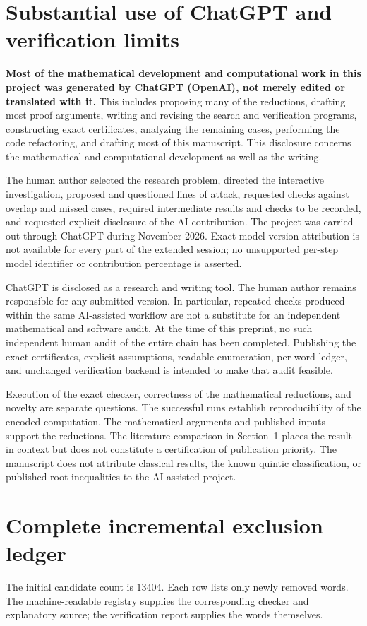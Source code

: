 \documentclass[11pt]{article}
\theoremstyle{definition}
\begin{document}
\section{Substantial use of ChatGPT and verification limits}\label{sec:ai}

\textbf{Most of the mathematical development and computational work in this
project was generated by ChatGPT (OpenAI), not merely edited or translated
with it.} This includes proposing many of the reductions, drafting most
proof arguments, writing and revising the search and verification
programs, constructing exact certificates, analyzing the remaining cases,
performing the code refactoring, and drafting most of this manuscript.
This disclosure concerns the mathematical and computational development
as well as the writing.

The human author selected the research problem, directed the interactive
investigation, proposed and questioned lines of attack, requested checks
against overlap and missed cases, required intermediate results and checks
to be recorded, and requested explicit disclosure of the AI contribution.
The project was carried out through ChatGPT during November 2026. Exact
model-version attribution is not available for every part of the extended
session; no unsupported per-step model identifier or contribution
percentage is asserted.

ChatGPT is disclosed as a research and writing tool. The human author
remains responsible for any submitted version. In particular, repeated
checks produced within the same AI-assisted workflow are not a substitute
for an independent mathematical and software audit. At the time of this
preprint, no such independent human audit of the entire chain has been
completed. Publishing the exact certificates, explicit assumptions,
readable enumeration, per-word ledger, and unchanged verification backend
is intended to make that audit feasible.

Execution of the exact checker, correctness of the mathematical
reductions, and novelty are separate questions. The successful runs
establish reproducibility of the encoded computation. The mathematical
arguments and published inputs support the reductions. The literature
comparison in Section~1 places the result in context but does not
constitute a certification of publication priority.
The manuscript does not attribute classical results, the known quintic
classification, or published root inequalities to the AI-assisted project.

\appendix
\section{Complete incremental exclusion ledger}\label{app:ledger}
The initial candidate count is $13404$. Each row lists only newly removed
words. The machine-readable registry supplies the corresponding checker
and explanatory source; the verification report supplies the words themselves.

\end{document}

